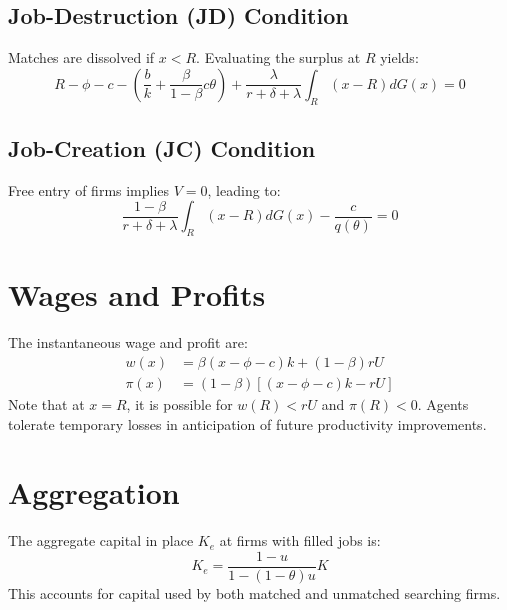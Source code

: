 \documentclass[11pt]{article}
\begin{document}
\subsection{Job-Destruction (JD) Condition}
Matches are dissolved if $x < R$. Evaluating the surplus at $R$ yields:
\begin{equation}
R - \phi - c - \left( \frac{b}{k} + \frac{\beta}{1-\beta} c \theta \right) + \frac{\lambda}{r + \delta + \lambda} \int_R (x - R) dG(x) = 0
\end{equation}

\subsection{Job-Creation (JC) Condition}
Free entry of firms implies $V = 0$, leading to:
\begin{equation}
\frac{1-\beta}{r + \delta + \lambda} \int_R (x - R) dG(x) - \frac{c}{q(\theta)} = 0
\end{equation}

\section{Wages and Profits}
The instantaneous wage and profit are:
\begin{align}
w(x) &= \beta(x - \phi - c)k + (1 - \beta)rU \\
\pi(x) &= (1 - \beta)[(x - \phi - c)k - rU]
\end{align}
Note that at $x = R$, it is possible for $w(R) < rU$ and $\pi(R) < 0$. Agents tolerate temporary losses in anticipation of future productivity improvements.

\section{Aggregation}
The aggregate capital in place $K_e$ at firms with filled jobs is:
\begin{equation}
K_e = \frac{1 - u}{1 - (1 - \theta)u} K
\end{equation}
This accounts for capital used by both matched and unmatched searching firms.
\end{document}
